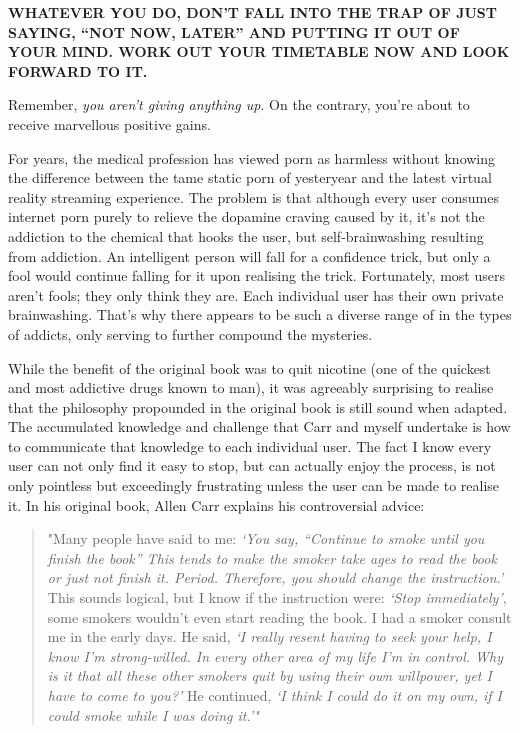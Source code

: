 \documentclass[
]{book}
\begin{document}
\textbf{WHATEVER YOU DO, DON'T FALL INTO THE TRAP OF JUST SAYING, ``NOT NOW, LATER'' AND PUTTING IT OUT OF YOUR MIND. WORK OUT YOUR TIMETABLE NOW AND LOOK FORWARD TO IT.}

Remember, \emph{you aren't giving anything up}. On the contrary, you're about to receive marvellous positive gains.

For years, the medical profession has viewed porn as harmless without knowing the difference between the tame static porn of yesteryear and the latest virtual reality streaming experience. The problem is that although every user consumes internet porn purely to relieve the dopamine craving caused by it, it's not the addiction to the chemical that hooks the user, but self-brainwashing resulting from addiction. An intelligent person will fall for a confidence trick, but only a fool would continue falling for it upon realising the trick. Fortunately, most users aren't fools; they only think they are. Each individual user has their own private brainwashing. That's why there appears to be such a diverse range of in the types of addicts, only serving to further compound the mysteries.

While the benefit of the original book was to quit nicotine (one of the quickest and most addictive drugs known to man), it was agreeably surprising to realise that the philosophy propounded in the original book is still sound when adapted. The accumulated knowledge and challenge that Carr and myself undertake is how to communicate that knowledge to each individual user. The fact I know every user can not only find it easy to stop, but can actually enjoy the process, is not only pointless but exceedingly frustrating unless the user can be made to realise it. In his original book, Allen Carr explains his controversial advice:

\begin{quote}
"Many people have said to me: \emph{`You say, ``Continue to smoke until you finish the book'' This tends to make the smoker take ages to read the book or just not finish it. Period. Therefore, you should change the instruction.'} This sounds logical, but I know if the instruction were: \emph{`Stop immediately'}, some smokers wouldn't even start reading the book. I had a smoker consult me in the early days. He said, \emph{`I really resent having to seek your help, I know I'm strong-willed. In every other area of my life I'm in control. Why is it that all these other smokers quit by using their own willpower, yet I have to come to you?'} He continued, \emph{`I think I could do it on my own, if I could smoke while I was doing it.'"}
\end{quote}
\end{document}

